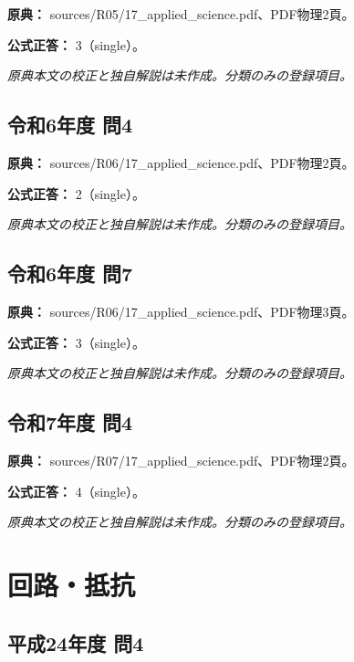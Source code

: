 \noindent\textbf{原典：} sources/R05/17\_applied\_science.pdf、PDF物理2頁。

\textbf{公式正答：} 3（single）。

\par\textit{原典本文の校正と独自解説は未作成。分類のみの登録項目。}

\subsection{令和6年度 問4}
\label{q:r06-reg-applied-04}

\noindent\textbf{原典：} sources/R06/17\_applied\_science.pdf、PDF物理2頁。

\textbf{公式正答：} 2（single）。

\par\textit{原典本文の校正と独自解説は未作成。分類のみの登録項目。}

\subsection{令和6年度 問7}
\label{q:r06-reg-applied-07}

\noindent\textbf{原典：} sources/R06/17\_applied\_science.pdf、PDF物理3頁。

\textbf{公式正答：} 3（single）。

\par\textit{原典本文の校正と独自解説は未作成。分類のみの登録項目。}

\subsection{令和7年度 問4}
\label{q:r07-reg-applied-04}

\noindent\textbf{原典：} sources/R07/17\_applied\_science.pdf、PDF物理2頁。

\textbf{公式正答：} 4（single）。

\par\textit{原典本文の校正と独自解説は未作成。分類のみの登録項目。}

\section{回路・抵抗}

\subsection{平成24年度 問4}
\label{q:h24-reg-applied-04}

